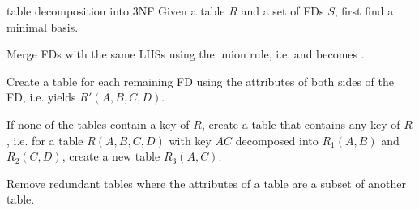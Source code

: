 \begin{defn}{table decomposition into 3NF}
    Given a table $R$ and a set of FDs $S$, first find a minimal basis.

    Merge FDs with the same LHSs using the union rule, i.e.  and  becomes .

    Create a table for each remaining FD using the attributes of both sides of the FD, i.e.  yields $R'(A, B, C, D)$.

    If none of the tables contain a key of $R$, create a table that contains any key of $R$, i.e. for a table $R(A, B, C, D)$ with key $AC$ decomposed into $R_1(A, B)$ and $R_2(C, D)$, create a new table $R_3(A, C)$.

    Remove redundant tables where the attributes of a table are a subset of another table.
\end{defn}